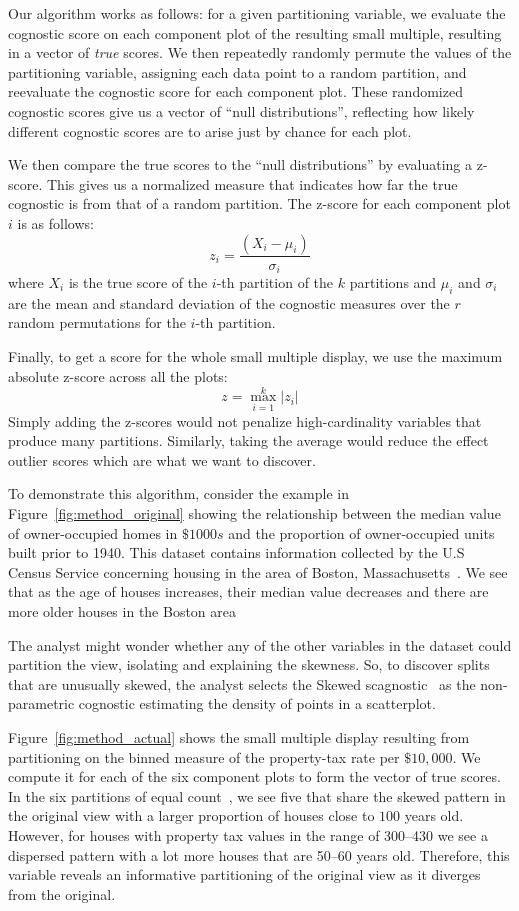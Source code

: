Our algorithm works as follows: for a given partitioning variable, we evaluate the cognostic score on each component plot of the resulting small multiple, resulting in a vector of \emph{true} scores. We then repeatedly randomly permute the values of the partitioning variable, assigning each data point to a random partition, and reevaluate the cognostic score for each component plot. These randomized cognostic scores give us a vector of ``null distributions'', reflecting how likely different cognostic scores are to arise just by chance for each plot.

We then compare the true scores to the ``null distributions'' by evaluating a z-score. This gives us a normalized measure that indicates how far the true cognostic is from that of a random partition. The z-score for each component plot $i$ is as follows:
$$z_i = \frac{(X_i-\mu_i)}{\sigma_i}$$ 
where $X_i$ is the true score of the $i$-th partition of the $k$ partitions and $\mu_i$ and $\sigma_i$ are the mean and standard deviation of the cognostic measures over the $r$ random permutations for the $i$-th partition.

Finally, to get a score for the whole small multiple display, we use the maximum absolute z-score across all the plots: 
$$z = \max_{i=1}^k |z_i|$$ 
Simply adding the z-scores would not penalize high-cardinality variables that produce many partitions. Similarly, taking the average would reduce the effect outlier scores which are what we want to discover.

To demonstrate this algorithm, consider the example in Figure~\ref{fig:method_original} showing the relationship between the median value of owner-occupied homes in $\$1000s$ and the proportion of owner-occupied units built prior to 1940. This dataset contains information collected by the U.S Census Service concerning housing in the area of Boston, Massachusetts~\cite{Harrison1978}. We see that as the age of houses increases, their median value decreases and there are more older houses in the Boston area

The analyst might wonder whether any of the other variables in the dataset could partition the view, isolating and explaining the skewness. So, to discover splits that are unusually skewed, the analyst selects the Skewed scagnostic~\cite{Wilkinson2005} as the non-parametric cognostic estimating the density of points in a scatterplot. 

Figure~\ref{fig:method_actual} shows the small multiple display resulting from partitioning on the binned measure of the property-tax rate per $\$10,000$. We compute it for each of the six component plots to form the vector of true scores. In the six partitions of equal count~\cite{Becker1996}, we see five that share the skewed pattern in the original view with a larger proportion of houses close to $100$ years old. However, for houses with property tax values in the range of 300--430 we see a dispersed pattern with a lot more houses that are 50--60 years old. Therefore, this variable reveals an informative partitioning of the original view as it diverges from the original.

